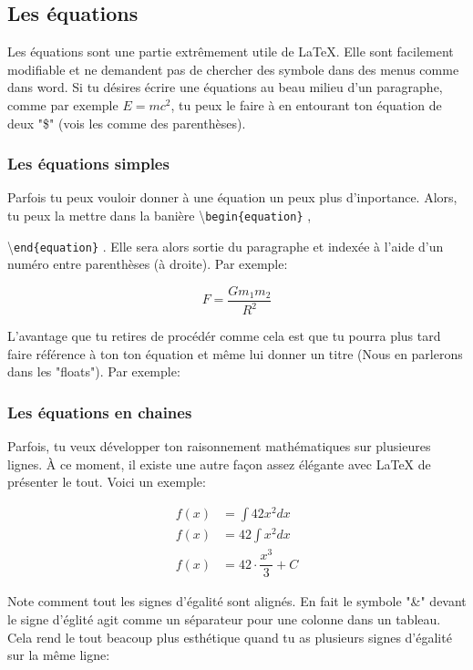 \documentclass[a4paper, 10pt]{article}
\newcommand{\command}[1]{
  \colorbox{codebackground}{\scriptsize{\textbackslash}\texttt{#1}}
}
\begin{document}
\subsection{Les équations}

Les équations sont une partie extrêmement utile de \LaTeX.
Elle sont facilement modifiable et ne demandent pas de chercher des symbole
dans des menus comme dans word. Si tu désires écrire une équations
au beau milieu d'un paragraphe, comme par exemple $E=mc^2$, tu peux le faire
à en entourant ton équation de deux "\$" (vois les comme des parenthèses).

\subsubsection{Les équations simples}
Parfois tu peux vouloir donner à une équation un peux plus d'inportance.
Alors, tu peux la mettre dans la banière \command{begin\{equation\}},
\command{end\{equation\}}. Elle sera alors sortie du paragraphe et indexée
à l'aide d'un numéro entre parenthèses (à droite). Par exemple:

\begin{equation}
  F = \dfrac{ G m_1 m_2 }{ R^2 }
\end{equation}

L'avantage que tu retires de procédér comme cela est que tu pourra
plus tard faire référence à ton ton équation et même lui donner un
titre (Nous en parlerons dans les "floats"). Par exemple:

\subsubsection{Les équations en chaines}
Parfois, tu veux développer ton raisonnement mathématiques sur plusieures
lignes. À ce moment, il existe une autre façon assez élégante avec \LaTeX
de présenter le tout. Voici un exemple:

\begin{align}
  f(x) &= \int{42x^2 } dx \\
  f(x) &= 42\int{x^2 } dx \\
  f(x) &= 42 \cdot \dfrac{x^3}{3} + C
\end{align}

Note comment tout les signes d'égalité sont alignés. En fait le symbole "\&"
devant le signe d'églité agit comme un séparateur pour une colonne dans un
tableau. Cela rend le tout beacoup plus esthétique quand tu as plusieurs
signes d'égalité sur la même ligne:
\end{document}
